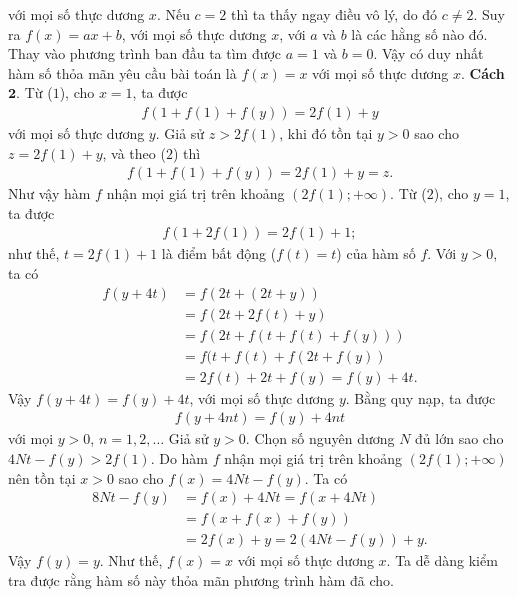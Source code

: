 \begin{multicols}{2}
			với mọi số thực dương $x$.
			Nếu $c=2$ thì ta thấy ngay điều vô lý, do đó $c \neq 2$. Suy ra $f(x)=a x+b$, với mọi số thực dương $x$, với $a$ và $b$ là các hằng số nào đó.
			Thay vào phương trình ban đầu ta tìm được $a=1$ và $b=0$.
			Vậy có duy nhất hàm số thỏa mãn yêu cầu bài toán là
			$
			f(x)=x$ với mọi số thực dương $x$.
			\vskip 0.1cm
			\textbf{\color{hoccungpi}Cách $\pmb{2.}$} 
			Từ ($1$), cho $x=1$, ta được
			\begin{align*}
				f\left( {1 + f(1) + f(y)} \right) = 2f(1) + y\tag{$2$}
			\end{align*}
			với mọi số thực dương $y$.
			Giả sử $z>2f(1)$, khi đó tồn tại $y>0$ sao cho $z=2f(1)+y$, và theo ($2$) thì
			\begin{align*}
				f\left( {1 + f(1) + f(y)} \right) = 2f(1) + y=z.
			\end{align*}
			Như vậy hàm $f$ nhận mọi giá trị trên khoảng $\left( {2f(1); + \infty } \right)$.
			Từ ($2$), cho $y=1$, ta được
			\begin{align*}
				f\left( {1 + 2f(1)} \right) = 2f(1) + 1;
			\end{align*}
			như thế, $t=2f(1)+1$ là điểm bất động ($f(t)=t$) của hàm số $f$. Với $y>0$, ta có
			\begin{align*}
				f\left( {y + 4t} \right) &= f\left( {2t + (2t + y)} \right)\\
				&= f\left( {2t + 2f(t) + y} \right)\\
				&	= f\left( {2t + f\left( {t + f(t) + f(y)} \right)} \right)\\
				&= f(t + f(t) + f\left( {2t + f(y)} \right)\\
				&= 2f\left( t \right) + 2t + f(y)
				= f(y) + 4t.
			\end{align*}Vậy $	f\left( {y + 4t} \right)= f(y) + 4t$, với mọi số thực dương $y$. Bằng quy nạp, ta được
			\begin{align*}
				f\left( {y + 4nt} \right) = f(y) + 4nt
			\end{align*}
			với mọi  $y>0$, $n=1,2,\ldots$
			Giả sử $y>0$. Chọn số nguyên dương $N$ đủ lớn sao cho
			$4Nt-f(y)>2f(1)$. Do hàm $f$ nhận mọi giá trị trên khoảng $\left( {2f(1); + \infty } \right)$
			nên tồn tại $x>0$ sao cho $f(x)=4Nt-f(y)$.
			Ta có
			\begin{align*}
				8Nt - f(y) &= f(x) + 4Nt = f\left( {x + 4Nt} \right)\\
				& = f\left( {x + f(x) + f(y)} \right)\\
				&= 2f(x) \!+\! y \!=\! 2\left( {4Nt \!-\! f(y)} \right) \!+\! y.
			\end{align*}Vậy $f(y) = y$. Như thế, $f(x)=x$ với mọi số thực dương $x$. Ta dễ dàng kiểm tra được rằng hàm số này thỏa mãn phương trình hàm đã cho.

\end{multicols}
